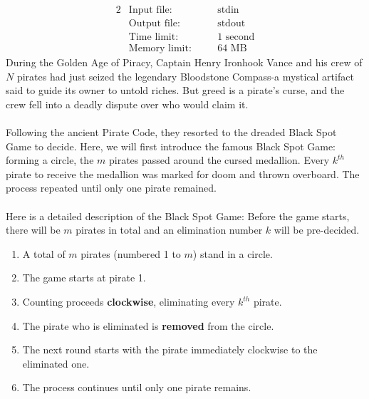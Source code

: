 \documentclass[12pt,a4paper]{article}
\begin{document}
\begin{alignat*} {2}
 &   \text{Input file:}   \quad     &&\text{stdin}\\
 &   \text{Output file:}  \quad     &&\text{stdout}\\
 &   \text{Time limit:}   \quad     &&\text{1 second}\\
 &   \text{Memory limit:} \quad     &&\text{64 MB}
\end{alignat*}
\noindent
During the Golden Age of Piracy, Captain Henry Ironhook Vance and his crew of \(N\) pirates had just seized the legendary Bloodstone Compass-a mystical artifact said to guide its owner to untold riches. 
But greed is a pirate's curse, and the crew fell into a deadly dispute over who would claim it.\\
\noindent\\
Following the ancient Pirate Code, they resorted to the dreaded Black Spot Game to decide. 
Here, we will first introduce the famous Black Spot Game: forming a circle, the \(m\) pirates passed around the cursed medallion. 
Every \(k^{th}\) pirate to receive the medallion was marked for doom and thrown overboard. 
The process repeated until only one pirate remained.\\
\noindent\\
Here is a detailed description of the Black Spot Game:
Before the game starts, there will be \(m\) pirates in total and an elimination number \(k\) will be pre-decided.
\begin{enumerate}
    \setlength{\itemsep}{-3pt} %
    \item A total of \(m\) pirates (numbered 1 to \(m\)) stand in a circle.
    \item The game starts at pirate 1.
    \item Counting proceeds \textbf{clockwise}, eliminating every \(k^{th}\) pirate.
    \item The pirate who is eliminated is \textbf{removed} from the circle.
    \item The next round starts with the pirate immediately clockwise to the eliminated one.
    \item The process continues until only one pirate remains.
\end{enumerate}
\end{document}
